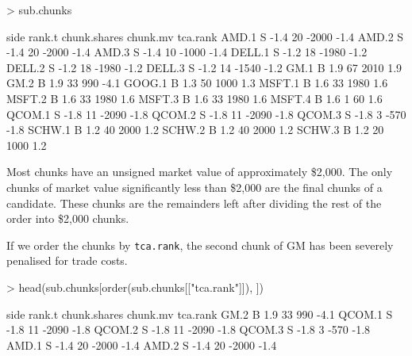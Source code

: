 \documentclass{article}
\begin{document}
\begin{Schunk}
\begin{Sinput}
> sub.chunks
\end{Sinput}
\begin{Soutput}
       side rank.t chunk.shares chunk.mv tca.rank
AMD.1     S   -1.4           20    -2000     -1.4
AMD.2     S   -1.4           20    -2000     -1.4
AMD.3     S   -1.4           10    -1000     -1.4
DELL.1    S   -1.2           18    -1980     -1.2
DELL.2    S   -1.2           18    -1980     -1.2
DELL.3    S   -1.2           14    -1540     -1.2
GM.1      B    1.9           67     2010      1.9
GM.2      B    1.9           33      990     -4.1
GOOG.1    B    1.3           50     1000      1.3
MSFT.1    B    1.6           33     1980      1.6
MSFT.2    B    1.6           33     1980      1.6
MSFT.3    B    1.6           33     1980      1.6
MSFT.4    B    1.6            1       60      1.6
QCOM.1    S   -1.8           11    -2090     -1.8
QCOM.2    S   -1.8           11    -2090     -1.8
QCOM.3    S   -1.8            3     -570     -1.8
SCHW.1    B    1.2           40     2000      1.2
SCHW.2    B    1.2           40     2000      1.2
SCHW.3    B    1.2           20     1000      1.2
\end{Soutput}
\end{Schunk}

Most chunks have an unsigned market value of approximately
\$2,000.  The only chunks of
market value significantly less than
\$2,000 are the final chunks of
a candidate.  These chunks are the remainders left after dividing the
rest of the order into \$2,000
chunks.



If we order the chunks by \texttt{tca.rank}, the second chunk of GM
has been severely penalised for trade costs.

\begin{Schunk}
\begin{Sinput}
> head(sub.chunks[order(sub.chunks[["tca.rank"]]), ])
\end{Sinput}
\begin{Soutput}
       side rank.t chunk.shares chunk.mv tca.rank
GM.2      B    1.9           33      990     -4.1
QCOM.1    S   -1.8           11    -2090     -1.8
QCOM.2    S   -1.8           11    -2090     -1.8
QCOM.3    S   -1.8            3     -570     -1.8
AMD.1     S   -1.4           20    -2000     -1.4
AMD.2     S   -1.4           20    -2000     -1.4
\end{Soutput}
\end{Schunk}
\end{document}
